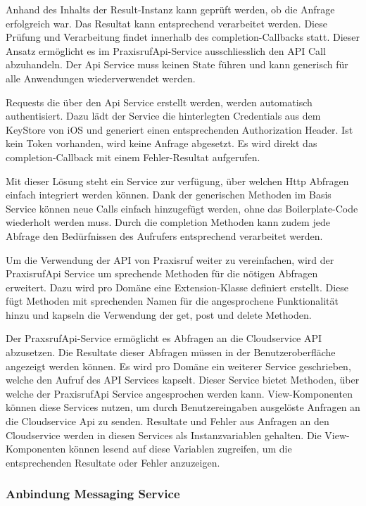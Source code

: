 Anhand des Inhalts der Result-Instanz kann geprüft werden, ob die Anfrage erfolgreich war.
Das Resultat kann entsprechend verarbeitet werden.
Diese Prüfung und Verarbeitung findet innerhalb des completion-Callbacks statt.
Dieser Ansatz ermöglicht es im PraxisrufApi-Service ausschliesslich den API Call abzuhandeln.
Der Api Service muss keinen State führen und kann generisch für alle Anwendungen wiederverwendet werden.

Requests die über den Api Service erstellt werden, werden automatisch authentisiert.
Dazu lädt der Service die hinterlegten Credentials aus dem KeyStore von iOS und generiert einen entsprechenden Authorization Header.
Ist kein Token vorhanden, wird keine Anfrage abgesetzt.
Es wird direkt das completion-Callback mit einem Fehler-Resultat aufgerufen.

Mit dieser Lösung steht ein Service zur verfügung, über welchen Http Abfragen einfach integriert werden können.
Dank der generischen Methoden im Basis Service können neue Calls einfach hinzugefügt werden, ohne das Boilerplate-Code wiederholt werden muss.
Durch die completion Methoden kann zudem jede Abfrage den Bedürfnissen des Aufrufers entsprechend verarbeitet werden.

Um die Verwendung der API von Praxisruf weiter zu vereinfachen, wird der PraxisrufApi Service um sprechende Methoden für die nötigen Abfragen erweitert.
Dazu wird pro Domäne eine Extension-Klasse definiert erstellt.
Diese fügt Methoden mit sprechenden Namen für die angesprochene Funktionalität hinzu und kapseln die Verwendung der get, post und delete Methoden.

Der PraxsrufApi-Service ermöglicht es Abfragen an die Cloudservice API abzusetzen.
Die Resultate dieser Abfragen müssen in der Benutzeroberfläche angezeigt werden können.
Es wird pro Domäne ein weiterer Service geschrieben, welche den Aufruf des API Services kapselt.
Dieser Service bietet Methoden, über welche der PraxisrufApi Service angesprochen werden kann.
View-Komponenten können diese Services nutzen, um durch Benutzereingaben ausgelöste Anfragen an die Cloudservice Api zu senden.
Resultate und Fehler aus Anfragen an den Cloudservice werden in diesen Services als Instanzvariablen gehalten.
Die View-Komponenten können lesend auf diese Variablen zugreifen, um die entsprechenden Resultate oder Fehler anzuzeigen.

\subsubsection{Anbindung Messaging Service}


